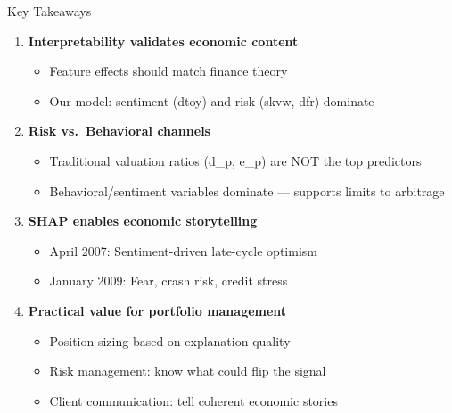 \documentclass[10pt]{beamer}
\begin{document}
\begin{frame}{Key Takeaways}

  \begin{enumerate}
    \item \textbf{Interpretability validates economic content}
    \begin{itemize}
      \item Feature effects should match finance theory
      \item Our model: sentiment (dtoy) and risk (skvw, dfr) dominate
    \end{itemize}

    \vspace{0.3em}
    \item \textbf{Risk vs.\ Behavioral channels}
    \begin{itemize}
      \item Traditional valuation ratios (d\_p, e\_p) are NOT the top predictors
      \item Behavioral/sentiment variables dominate --- supports limits to arbitrage
    \end{itemize}

    \vspace{0.3em}
    \item \textbf{SHAP enables economic storytelling}
    \begin{itemize}
      \item April 2007: Sentiment-driven late-cycle optimism
      \item January 2009: Fear, crash risk, credit stress
    \end{itemize}

    \vspace{0.3em}
    \item \textbf{Practical value for portfolio management}
    \begin{itemize}
      \item Position sizing based on explanation quality
      \item Risk management: know what could flip the signal
      \item Client communication: tell coherent economic stories
    \end{itemize}
  \end{enumerate}
\end{frame}

\end{document}
